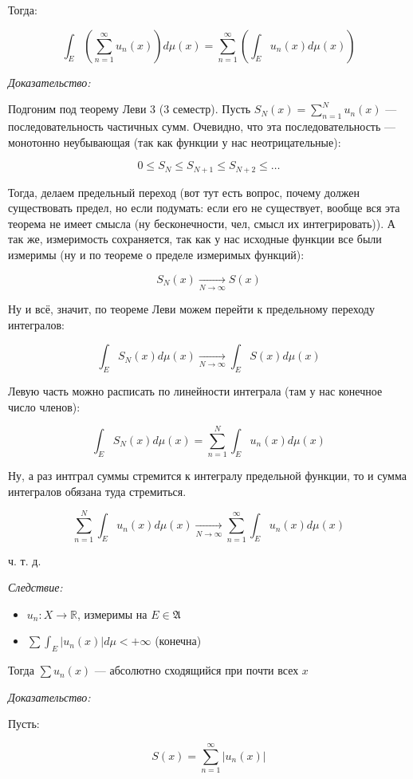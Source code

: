 \documentclass{article}
\def\goesto#1{\underset{#1}{\longrightarrow}}
\def\toinf#1{\goesto{#1 \rightarrow \infty}}
\begin{document}
Тогда: 

\[\int_{E} \left(\sum_{n = 1}^{\infty} u_n(x)\right)d\mu(x) = \sum_{n = 1}^{\infty} \left(\int_{E} u_n(x) d\mu(x)\right)\]

\textit{Доказательство:}

Подгоним под теорему Леви 3 (3 семестр). Пусть $S_{N}(x) = \sum_{n = 1}^{N} u_n(x)$ --- последовательность частичных сумм. Очевидно, что эта последовательность --- монотонно неубывающая (так как функции у нас неотрицательные): 

\[0 \le S_{N} \le S_{N + 1} \le S_{N + 2} \le \ldots\]

Тогда, делаем предельный переход (вот тут есть вопрос, почему должен существовать предел, но если подумать: если его не существует, вообще вся эта теорема не имеет смысла (ну бесконечности, чел, смысл их интегрировать)). А так же, измеримость сохраняется, так как у нас исходные функции все были измеримы (ну и по теореме о пределе измеримых функций): 

\[S_{N}(x) \toinf{N} S(x)\]

Ну и всё, значит, по теореме Леви можем перейти к предельному переходу интегралов: 

\[\int_{E} S_{N}(x) d\mu(x) \toinf{N} \int_{E} S(x) d\mu(x)\]

Левую часть можно расписать по линейности интеграла (там у нас конечное число членов): 

\[\int_{E} S_{N}(x) d\mu(x) = \sum_{n = 1}^{N} \int_{E} u_n(x) d\mu(x)\]

Ну, а раз интграл суммы стремится к интегралу предельной функции, то и сумма интегралов обязана туда стремиться.

\[\sum_{n = 1}^{N} \int_{E} u_n(x) d\mu(x) \toinf{N} \sum_{n = 1}^{\infty} \int_{E} u_n(x) d\mu(x)\]

ч. т. д. 


\textit{Следствие: }

\begin{itemize}
    \item $u_n: X \rightarrow \mathbb{R}$, измеримы на $E \in \mathfrak{A}$
    \item $\sum \int_{E} |u_n(x)| d\mu < +\infty$ (конечна)
\end{itemize}

Тогда $\sum u_n(x)$ --- абсолютно сходящийся при почти всех $x$

\textit{Доказательство: }

Пусть: 

\[S(x) = \sum_{n = 1}^{\infty} \left|u_n(x)\right|\]
\end{document}
